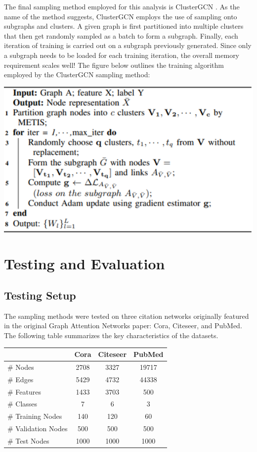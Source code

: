 \documentclass{article}
\begin{document}
	
	The final sampling method employed for this analysis is ClusterGCN \cite{2019}. As the name of the method suggests, ClusterGCN employs the use of sampling onto subgraphs and clusters. A given graph is first partitioned into multiple clusters that then get randomly sampled as a batch to form a subgraph. Finally, each iteration of training is carried out on a subgraph previously generated. Since only a subgraph needs to be loaded for each training iteration, the overall memory requirement scales well!
	The figure below outlines the training algorithm employed by the ClusterGCN sampling method:
	
	\begin{center}
		\includegraphics[scale=0.6]{Figures/cluster.png}
	\end{center}

	
	\section{Testing and Evaluation}
	
	\subsection{Testing Setup}
	
	The sampling methods were tested on three citation networks originally featured in the original Graph Attention Networks paper: Cora, Citeseer, and PubMed. The following table summarizes the key characteristics of the datasets. 
	
	\begin{center}
		\begin{tabular}{|l|c|c|c|}
			\hline
			& Cora & Citeseer & PubMed \\ \hline
			\# Nodes            & 2708 & 3327     & 19717  \\ \hline
			\# Edges            & 5429 & 4732     & 44338  \\ \hline
			\# Features         & 1433 & 3703     & 500    \\ \hline
			\# Classes          & 7    & 6        & 3      \\ \hline
			\# Training Nodes   & 140  & 120      & 60     \\ \hline
			\# Validation Nodes & 500  & 500      & 500    \\ \hline
			\# Test Nodes       & 1000 & 1000     & 1000   \\ \hline
		\end{tabular}
	\end{center}
	
\end{document}

